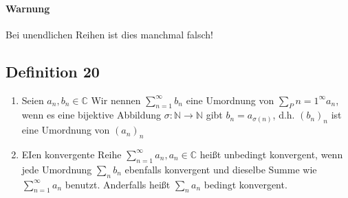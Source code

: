 \documentclass[fleqn]{scrbook}
\newcommand{\N}{\mathbb{N}}
\newcommand{\sumOI}{\sum_{n=1}^{\infty}}
\begin{document}
\paragraph{Warnung} Bei unendlichen Reihen ist dies manchmal falsch!

\subsection{Definition 20}
\begin{enumerate}[1)]
  \item Seien $a_n, b_n \in\mathbb{C}$
    Wir nennen $\sumOI b_n$ eine Umordnung von $\sum_P{n=1}^\infty a_n$, wenn es eine bijektive Abbildung 
    $\sigma : \N \rightarrow \N$ gibt $b_n = a_{\sigma (n)}$, d.h. $(b_n)_n$ ist eine Umordnung von $(a_n)_n$
  \item EIen konvergente Reihe $\sumOI a_n, a_n \in\mathbb{C}$ heißt unbedingt konvergent, wenn jede Umordnung $\sum_n b_n$ ebenfalls konvergent und dieselbe Summe wie $\sumOI a_n$ benutzt. Anderfalls heißt $\sum_n a_n$ bedingt konvergent.
\end{enumerate}
\end{document}
